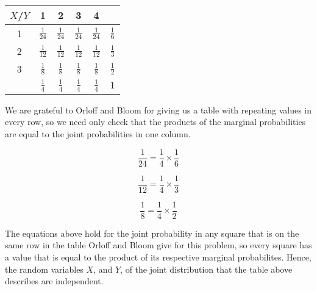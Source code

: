 \documentclass[a4paper,11pt]{article}
\begin{document}
\begin{center}
  \begin{tabular}{ | c | c | c | c  | c | c| }
    \hline
    $X$/$Y$ & 1 & 2 & 3 & 4 \\ \hline
    1 & $\frac{1}{24}$ & $\frac{1}{24}$ & $\frac{1}{24}$ & $\frac{1}{24}$ & $\frac{1}{6}$ \\ \hline
    2 & $\frac{1}{12}$ & $\frac{1}{12}$ & $\frac{1}{12}$ & $\frac{1}{12}$ & $\frac{1}{3}$ \\ \hline
    3 & $\frac{1}{8}$ & $\frac{1}{8}$ & $\frac{1}{8}$ & $\frac{1}{8}$ & $\frac{1}{2}$ \\ \hline
      & $\frac{1}{4}$ &  $\frac{1}{4}$ & $\frac{1}{4}$ & $\frac{1}{4}$ & $1$ \\ \hline
  \end{tabular}
\end{center}

We are grateful to Orloff and Bloom for giving us a table with repeating values
in every row, so we need only check that the products of the marginal
probabilities are equal to the joint probabilities in one column.


\begin{equation}
  \frac{1}{24} = \frac{1}{4} \times \frac{1}{6}
\end{equation}

\begin{equation}
  \frac{1}{12} = \frac{1}{4} \times \frac{1}{3}
\end{equation}

\begin{equation}
  \frac{1}{8} = \frac{1}{4} \times \frac{1}{2}
\end{equation}

The equations above hold for the joint probability in any square that is on the
same row in the table Orloff and Bloom give for this problem, so every
square has a value that is equal to the product of its respective marginal
probabilites.  Hence, the random variables $X$, and $Y$, of the joint
distribution that the table above describes are independent.

\printbibliography{}
\end{document}
